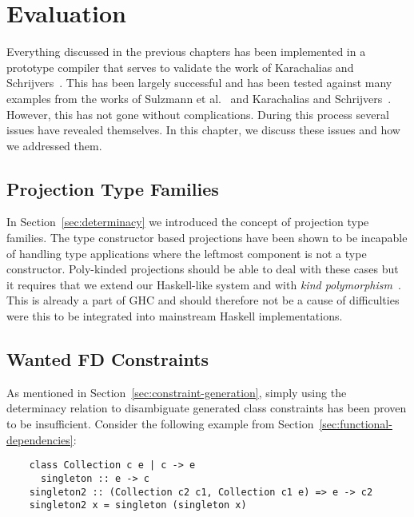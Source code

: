 \chapter{Evaluation}
\label{cha:evalutation}

Everything discussed in the previous chapters has been implemented in a
prototype compiler that serves to validate the work of Karachalias and Schrijvers~\cite{Karachalias:2017:EFD:3156695.3122966}. This has been largely
successful and has been tested against many examples from the works of Sulzmann
et al.~\cite{fundeps-chrs} and Karachalias and Schrijvers~\cite{Karachalias:2017:EFD:3156695.3122966}.
However, this has not gone without complications. During this process several
issues have revealed themselves. In this chapter, we discuss these issues and
how we addressed them.

\section{Projection Type Families}

In Section~\ref{sec:determinacy} we introduced the concept of projection type
families. The type constructor based projections have been shown to be incapable
of handling type applications where the leftmost component is not a type
constructor. Poly-kinded projections should be able to deal with these cases but
it requires that we extend our Haskell-like system and \systemfc with
\textit{kind polymorphism}~\cite{yorgey}. This is already a part of GHC and
should therefore not be a cause of difficulties were this to be integrated into
mainstream Haskell implementations.

\section{Wanted FD Constraints}
\label{sec:wanted-fd-constraints}

As mentioned in Section~\ref{sec:constraint-generation}, simply using the
determinacy relation to disambiguate generated class constraints has been proven
to be insufficient. Consider the following example from
Section~\ref{sec:functional-dependencies}:

\begin{verbatim}
    class Collection c e | c -> e
      singleton :: e -> c
    singleton2 :: (Collection c2 c1, Collection c1 e) => e -> c2
    singleton2 x = singleton (singleton x)
\end{verbatim}

